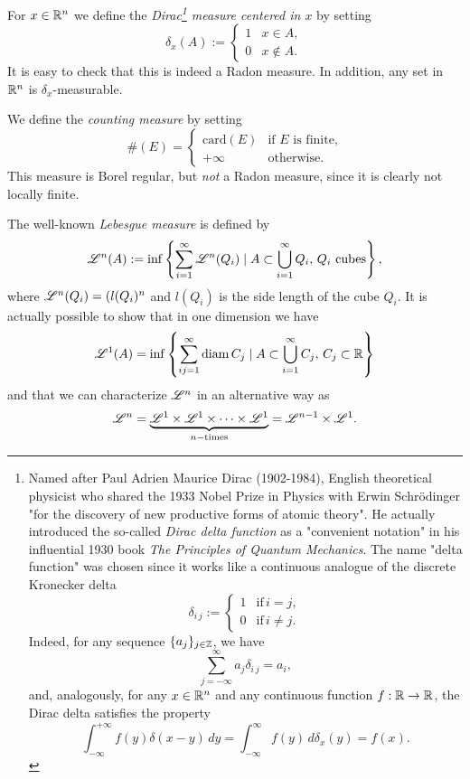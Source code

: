 \begin{example}
For $x \in \mathbb{R}^n$ we define the \emph{Dirac\footnote{Named after Paul Adrien Maurice Dirac (1902-1984), English theoretical physicist who shared the 1933 Nobel Prize in Physics with Erwin Schrödinger "for the discovery of new productive forms of atomic theory". He actually introduced the so-called {\em Dirac delta function} as a "convenient notation" in his influential 1930 book {\em The Principles of Quantum Mechanics}. The name "delta function" was chosen since it works like a continuous analogue of the discrete Kronecker delta 
\[
\delta_{i \, j} := 
\begin{cases}
1 & \text{if} \, i = j,
\\
0 & \text{if} \, i \neq j.
\end{cases}
\]
Indeed, for any sequence $\{a_{j}\}_{j \in \mathbb{Z}}$, we have
\begin{equation*}
\sum_{j = -\infty}^{\infty} a_{j} \delta_{i \, j} = a_{i},
\end{equation*}
and, analogously, for any $x \in \mathbb{R}^{n}$ and any continuous function $f : \mathbb{R} \to \mathbb{R}$, the Dirac delta satisfies the property
\begin{equation*}
\int_{- \infty}^{+ \infty} f(y) \delta(x - y) \, dy = \int_{- \infty}^{\infty} f(y)\, d \delta_{x}(y) = f(x).
\end{equation*}
} measure centered in $x$} by setting
\[
\delta_x(A) := 
\begin{cases}
1 & x \in A,
\\
0 & x \not\in A.
\end{cases}
\]
It is easy to check that this is indeed a Radon measure. In addition, any set in $\mathbb{R}^{n}$ is $\delta_{x}$-measurable.
\end{example}

\begin{example} 
We define the \emph{counting measure} by setting
\[
\# (E) = 
\begin{cases}
\text{card}(E) & \text{if $E$ is finite,}
\\
+\infty & \text{otherwise}.
\end{cases}
\]
This measure is Borel regular, but \emph{not} a Radon measure, since it is
clearly not locally finite.
\end{example}

\begin{example} 
The well-known \emph{Lebesgue measure} is defined by
\[
\mathscr{L}^{n}(A) := \inf \left\{\sum_{i=1}^\infty \mathscr{L}^{n}(Q_i) \mid A
\subset \bigcup_{i=1}^\infty Q_i,\, Q_i \text{ cubes}\right\},
\]
where $\mathscr{L}^{n}(Q_i) = ( l(Q_{i})^{n}$ and $l(Q_{i})$ is the side length of the cube $Q_i$. It is actually possible to show that in one dimension we have
\[
\mathscr{L}^{1}(A) = \inf \left\{ \sum_{ij=1}^\infty  \operatorname{diam} C_j \mid A
\subset \bigcup_{i=1}^\infty C_j, \, C_j \subset \mathbb{R} \right\}
\]
and that we can characterize $\mathscr{L}^{n}$ in an alternative way as
\[
\mathscr{L}^{n} = \underbrace{\mathscr{L}^{1}\times\mathscr{L}^{1} \times \dots \times \mathscr{L}^{1}}_{n-\text{times}} = \mathscr{L}^{n-1} \times \mathscr{L}^{1}.
\]
\end{example}


